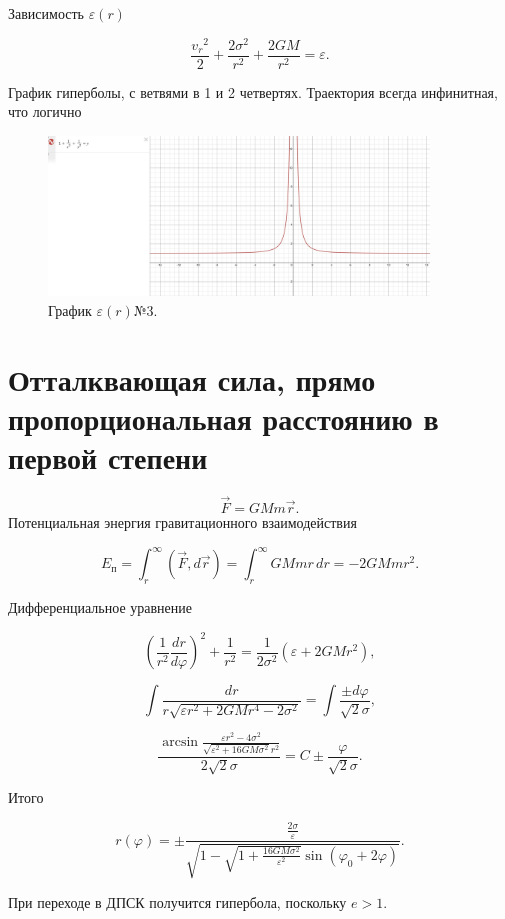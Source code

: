 \documentclass[a4paper]{article}
\begin{document}
Зависимость $\varepsilon(r)$

\[
\frac{{v_{r}}^2}{2} + \frac{2\sigma^2}{r^2} + \frac{2GM}{r^2} = \varepsilon.
\]

График гиперболы, с ветвями в 1 и 2 четвертях. Траектория всегда инфинитная, что логично

\begin{figure}[h]
    \centering
    \includegraphics[width=0.9\textwidth]{Finit3.jpg}
    \caption{График $\varepsilon(r) $№3.}
\end{figure}

\section{Отталквающая сила, прямо пропорциональная расстоянию в первой степени}
\[
\vec{F} = GMm \vec{r}.
\]
Потенциальная энергия гравитационного взаимодействия

\[
E_{\text{п}} = \int_{r}^{\infty}{(\vec{F} , d\vec{r})} = \int_{r}^{\infty}{GMmr \, dr} = -2GMm r^2.
\]

Дифференциальное уравнение

\[
(\frac{1}{r^2}\frac{dr}{d\varphi})^2 + \frac{1}{r^2} = \frac{1}{2\sigma^2}(\varepsilon + 2GMr^2),
\]

\[
\int{\frac{dr}{r\sqrt{\varepsilon r^2 + 2GMr^4 - 2\sigma^2}}} = \int{\frac{\pm d\varphi}{\sqrt{2}\sigma}},
\]

\[
\frac{\arcsin{\frac{\varepsilon r^2 - 4\sigma^2}{\sqrt{\varepsilon^2+16GM\sigma^2} r^2}}}{2\sqrt{2}\sigma} = C \pm \frac{\varphi} {\sqrt{2}\sigma}.
\]

Итого

\begin{equation} \tag{10}
r(\varphi) =\pm \frac{\frac{2\sigma}{\varepsilon}}{\sqrt{1-\sqrt{1+\frac{16GM\sigma^2}{\varepsilon^2}}\sin{(\varphi_0 + 2\varphi)}}}.
\end{equation}

При переходе в ДПСК получится гипербола, поскольку $e > 1$.
\end{document}
